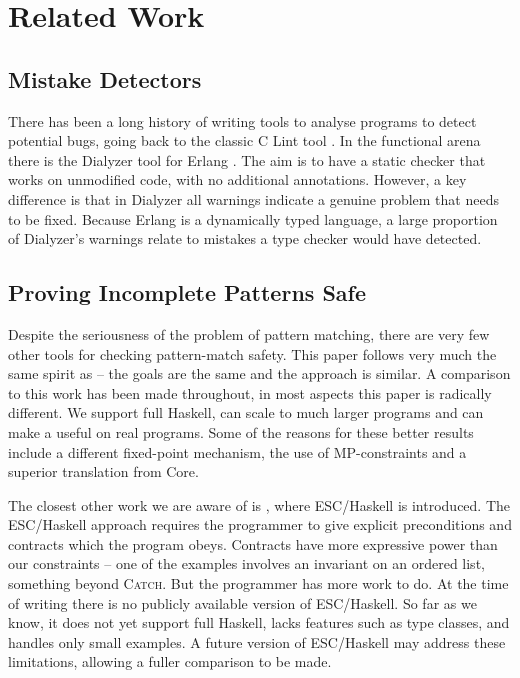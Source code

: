 \documentclass[preprint]{sigplanconf}
\let\cite=\citep
\newcommand{\catch}{\textsc{Catch}}
\begin{document}
\section{Related Work}
\label{sec:related}

\subsection{Mistake Detectors}

There has been a long history of writing tools to analyse programs to detect potential bugs, going back to the classic C Lint tool \citep{lint}. In the functional arena there is the Dialyzer tool \citep{dialyzer} for Erlang \citep{erlang}. The aim is to have a static checker that works on unmodified code, with no additional annotations. However, a key difference is that in Dialyzer all warnings indicate a genuine problem that needs to be fixed. Because Erlang is a dynamically typed language, a large proportion of Dialyzer's warnings relate to mistakes a type checker would have detected.

\subsection{Proving Incomplete Patterns Safe}

Despite the seriousness of the problem of pattern matching, there are very few other tools for checking pattern-match safety. This paper follows very much the same spirit as \cite{me:catch_tfp} -- the goals are the same and the approach is similar. A comparison to this work has been made throughout, in most aspects this paper is radically different. We support full Haskell, can scale to much larger programs and can make a useful on real programs. Some of the reasons for these better results include a different fixed-point mechanism, the use of MP-constraints and a superior translation from Core.

The closest other work we are aware of is \citep{esc_haskell}, where ESC/Haskell is introduced. The ESC/Haskell approach requires the programmer to give explicit preconditions and contracts which the program obeys. Contracts have more expressive power than our constraints -- one of the examples involves an invariant on an ordered list, something beyond \catch{}. But the programmer has more work to do. At the time of writing there is no publicly available version of ESC/Haskell. So far as we know, it does not yet support full Haskell, lacks features such as type classes, and handles only small examples. A future version of ESC/Haskell may address these limitations, allowing a fuller comparison to be made.
\end{document}
